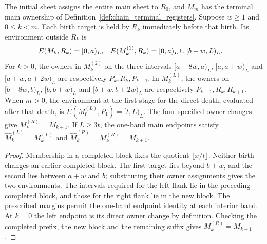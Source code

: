\begin{lemma}
    \label{thm:chain_sweep_stage_owners}
    \leanok
    The initial sheet assigns the entire main sheet to $R_0$, and $M_m$
    has the terminal main ownership of Definition~\ref{def:chain_terminal_registers}.
    Suppose $w\ge1$ and $0\le k<m$. Each birth target is held by $R_k$
    immediately before that birth. Its environment outside $R_k$ is
    \begin{align}
        E(M_k,R_k)       & =[0,a)_L,                                  &
        E(M_k^{(1)},R_k) & =\lbrack 0,a)_L\cup\lbrack b+w,L)_L.\notag
    \end{align}
    For $k>0$, the owners in $M_k^{(2)}$ on the three intervals
    $\lbrack a-8w,a)_L$, $\lbrack a,a+w)_L$ and $\lbrack a+w,a+2w)_L$ are respectively
    $P_k,R_k,P_{k+1}$.
    In $M_k^{(L)}$, the owners on $\lbrack b-8w,b)_L$, $\lbrack b,b+w)_L$ and
    $[b+w,b+2w)_L$ are respectively $P_{k+1},R_k,R_{k+1}$.
    When $m>0$, the environment at the first stage for the direct death, evaluated
    after that death, is $E(M_0^{(L)},P_1)=[t,L)_L$.
    The four specified owner changes give $M_k^{(R)}=M_{k+1}$.
    If $L\ge3t$, the one-band main endpoints satisfy
    $\widehat M_k^{(L)}=M_k^{(L)}$ and
    $\widehat M_k^{(R)}=M_k^{(R)}=M_{k+1}$.
\end{lemma}
\begin{proof}\leanok
    Membership in a completed block fixes the quotient $\lfloor x/t\rfloor$.
    Neither birth changes an earlier completed block. The first target
    lies beyond $b+w$, and the second lies between $a+w$ and $b$;
    substituting their owner assignments gives the two environments.
    The intervals required for the left flank lie in the preceding
    completed block, and those for the right flank lie in the new block.
    The prescribed margins permit the one-band endpoint identity at
    each interior band. At $k=0$ the left endpoint is its direct owner
    change by definition. Checking the completed prefix, the new block
    and the remaining suffix gives $M_k^{(R)}=M_{k+1}$.
\end{proof}

